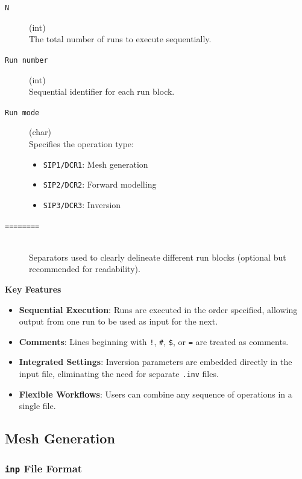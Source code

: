 \documentclass[a4paper,12pt]{article}
\begin{document}
\begin{description}
    \item[\texttt{N}] (int)\hfill \\
          The total number of runs to execute sequentially.

    \item[\texttt{Run number}] (int)\hfill \\
          Sequential identifier for each run block.

    \item[\texttt{Run mode}] (char)\hfill \\
          Specifies the operation type:
          \begin{itemize}
              \item \texttt{SIP1/DCR1}: Mesh generation
              \item \texttt{SIP2/DCR2}: Forward modelling  
              \item \texttt{SIP3/DCR3}: Inversion
          \end{itemize}

    \item[\texttt{========}] \hfill \\
          Separators used to clearly delineate different run blocks (optional but recommended for readability).
\end{description}

\textbf{Key Features}

\begin{itemize}
    \item \textbf{Sequential Execution}: Runs are executed in the order specified, allowing output from one run to be used as input for the next.
    \item \textbf{Comments}: Lines beginning with \texttt{!}, \texttt{\#}, \texttt{\$}, or \texttt{=} are treated as comments.
    \item \textbf{Integrated Settings}: Inversion parameters are embedded directly in the input file, eliminating the need for separate \texttt{.inv} files.
    \item \textbf{Flexible Workflows}: Users can combine any sequence of operations in a single file.
\end{itemize}

\newpage
\subsection{Mesh Generation}

\subsubsection{\texttt{inp} File Format} \label{mesh_inp}
\end{document}
